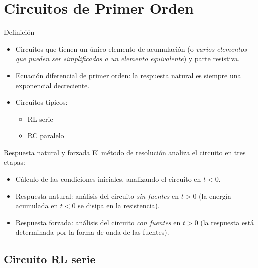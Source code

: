 \documentclass[aspectratio=169, usenames,svgnames,dvipsnames]{beamer}
\begin{document}
\section{Circuitos de Primer Orden}
\label{sec:org56e7440}
\begin{frame}[label={sec:org323a6b5}]{Definición}
\begin{itemize}
\item Circuitos que tienen un \alert{único elemento de acumulación} (o \emph{varios elementos que pueden ser simplificados a un elemento equivalente}) y parte resistiva.
\end{itemize}
\vfill
\begin{itemize}
\item \alert{Ecuación diferencial de primer orden}: la respuesta natural es siempre una \alert{exponencial decreciente}.
\end{itemize}
\vfill
\begin{itemize}
\item Circuitos típicos:
\begin{itemize}
\item RL serie
\item RC paralelo
\end{itemize}
\end{itemize}
\end{frame}
\begin{frame}[label={sec:org5da9dbe}]{Respuesta natural y forzada}
El método de resolución analiza el circuito en tres etapas:
  \vfill
\begin{itemize}
\item Cálculo de las \alert{condiciones iniciales}, analizando el circuito en \(t < 0\).
\end{itemize}
\vfill   
\begin{itemize}
\item \alert{Respuesta natural}: análisis del circuito \emph{sin fuentes} en \(t > 0\) (la energía acumulada en \(t < 0\) se disipa en la resistencia).
\end{itemize}
\vfill   
\begin{itemize}
\item \alert{Respuesta forzada}: análisis del circuito \emph{con fuentes} en \(t > 0\) (la respuesta está determinada por la forma de onda de las fuentes).
\end{itemize}
\end{frame}
\subsection{Circuito RL serie}
\label{sec:org4444d46}
\end{document}
